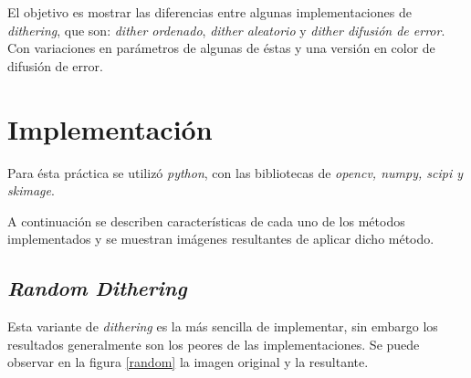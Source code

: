 \documentclass[conference]{IEEEtran}
\begin{document}
El objetivo es mostrar las diferencias entre algunas implementaciones de \textit{dithering}, que son: \textit{dither ordenado}, \textit{dither aleatorio} y \textit{dither difusión de error}. Con variaciones en parámetros de algunas de éstas y una versión en color de difusión de error.


%
%


\section{Implementación}

Para ésta práctica se utilizó \textit{python}, con las bibliotecas de \textit{opencv, numpy, scipi  y skimage}.

A continuación se describen características de cada uno de los métodos implementados y se muestran imágenes resultantes de aplicar dicho método.


\subsection{\textit{Random Dithering}}

Esta variante de \textit{dithering} es la más sencilla de implementar, sin embargo los resultados generalmente son los peores de las implementaciones. Se puede observar en la figura \ref{random} la  imagen original y la resultante.
\end{document}
